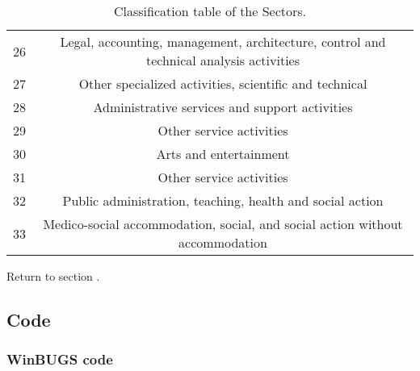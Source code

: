 \documentclass[]{article}
\begin{document}
\begin{table}[H]
\begin{tabular}{cc}
  26 & Legal, accounting, management, architecture, control and technical analysis activities \\ 
  27 & Other specialized activities, scientific and technical \\ 
  28 & Administrative services and support activities \\ 
  29 & Other service activities \\ 
  30 & Arts and entertainment \\ 
  31 & Other service activities  \\ 
  32 & Public administration, teaching, health and social action \\ 
  33 & Medico-social accommodation, social, and social action without accommodation \\ 
   \hline
\end{tabular}
\caption{Classification table of the Sectors. \label{tableIndexSectors}} 
\end{table}

Return to section .

\subsection{Code}\label{code}

\subsubsection{WinBUGS code}\label{winbugs-code}
\end{document}
